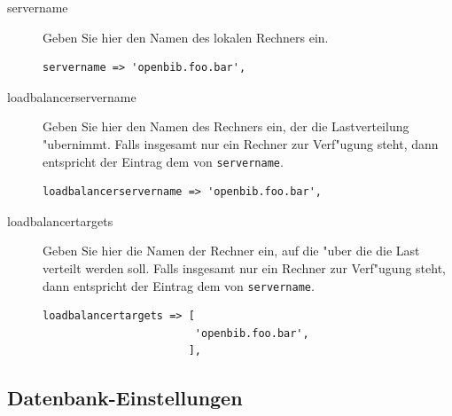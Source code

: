 \documentclass[11pt, twoside, a4paper, BCOR8mm, DIV12, bibtotoc,idxtotoc]{scrbook}
\begin{document}
\begin{description}
\item[servername] Geben Sie hier den Namen des lokalen Rechners
  ein. 
\begin{verbatim}
servername => 'openbib.foo.bar',
\end{verbatim}

\item[loadbalancerservername] Geben Sie hier den Namen des Rechners
  ein, der die Lastverteilung "ubernimmt. Falls insgesamt nur ein
  Rechner zur Verf"ugung steht, dann entspricht der Eintrag dem von
  \texttt{servername}.
\begin{verbatim}
loadbalancerservername => 'openbib.foo.bar',
\end{verbatim}

\item[loadbalancertargets] Geben Sie hier die Namen der Rechner ein,
  auf die "uber die die Last verteilt werden soll. Falls insgesamt nur
  ein Rechner zur Verf"ugung steht, dann entspricht der Eintrag dem
  von \texttt{servername}.
\begin{verbatim}
loadbalancertargets => [
                        'openbib.foo.bar',
                       ],
\end{verbatim}
\end{description}


\subsection{Datenbank-Einstellungen}
\end{document}
